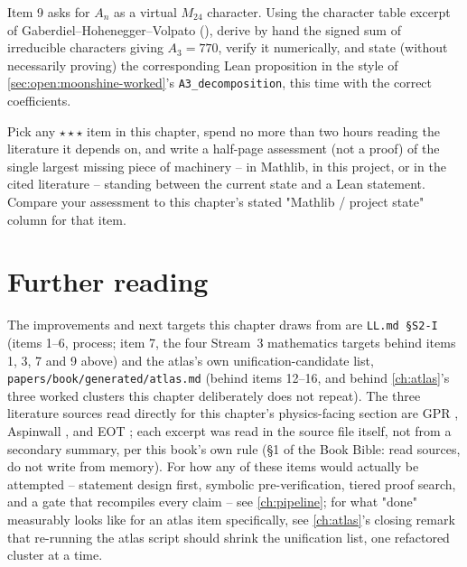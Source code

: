 \begin{exercise}[$\star\star\star$]
Item 9 asks for $A_n$ as a virtual $M_{24}$ character. Using the character table excerpt
of Gaberdiel--Hohenegger--Volpato (), derive by hand the
signed sum of irreducible characters giving $A_3=770$, verify it numerically, and state
(without necessarily proving) the corresponding Lean proposition in the style of
\cref{sec:open:moonshine-worked}'s \texttt{A3\_decomposition}, this time with the correct
coefficients.
\end{exercise}

\begin{exercise}[$\star\star\star$]
Pick any $\star\star\star$ item in this chapter, spend no more than two hours reading the
literature it depends on, and write a half-page assessment (not a proof) of the single
largest missing piece of machinery -- in Mathlib, in this project, or in the cited
literature -- standing between the current state and a Lean statement. Compare your
assessment to this chapter's stated "Mathlib / project state" column for that item.
\end{exercise}

\section*{Further reading}

The improvements and next targets this chapter draws from are \texttt{LL.md §S2-I}
(items 1--6, process; item 7, the four Stream~3 mathematics targets behind items 1, 3, 7
and 9 above) and the atlas's own unification-candidate list,
\texttt{papers/book/generated/atlas.md} (behind items 12--16, and behind
\cref{ch:atlas}'s three worked clusters this chapter deliberately does not repeat). The
three literature sources read directly for this chapter's physics-facing section are
GPR , Aspinwall
, and EOT
; each
excerpt was read in the source file itself, not from a secondary summary, per this book's
own rule (\S1 of the Book Bible: read sources, do not write from memory). For how any of
these items would actually be attempted --
statement design first, symbolic pre-verification, tiered proof search, and a gate that
recompiles every claim -- see \cref{ch:pipeline}; for what "done" measurably looks like for
an atlas item specifically, see \cref{ch:atlas}'s closing remark that re-running the
atlas script should shrink the unification list, one refactored cluster at a time.
